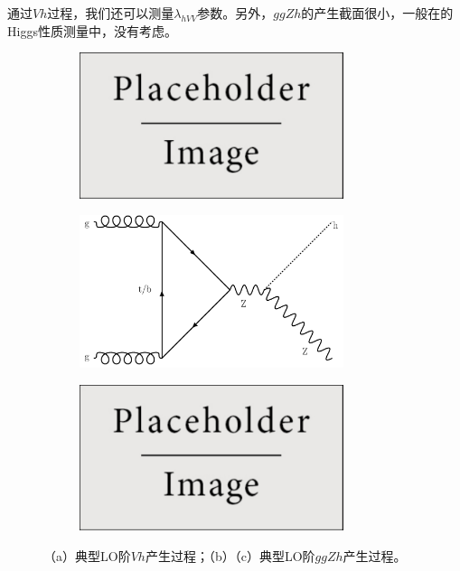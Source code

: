 通过$Vh$过程，我们还可以测量$\lambda_{hVV}$参数。另外，$ggZh$的产生截面很小，一般在的Higgs性质测量中，没有考虑。\\
\begin{figure}[h]
\centering
 \begin{subfigure}[b]{0.33\textwidth}
  \includegraphics[width=0.85\textwidth]{fig/placeholder.pdf}
  \caption{}
  \label{fig:diagram_VH}
 \end{subfigure}
 \begin{subfigure}[b]{0.33\textwidth}
  \includegraphics[width=0.85\textwidth]{fig/ggzh1_diagram.pdf}
  \caption{}
  \label{fig:diagram_ggzh1}
 \end{subfigure}
 \begin{subfigure}[b]{0.33\textwidth}
  \includegraphics[width=0.85\textwidth]{fig/placeholder.pdf}
  \caption{}
  \label{fig:diagram_ggzh1}
 \end{subfigure}
\caption{（a）典型LO阶$Vh$产生过程；（b）（c）典型LO阶$ggZh$产生过程。}
\label{fig:Vh_ggZh}
\end{figure}

